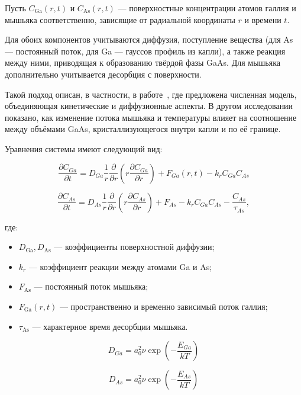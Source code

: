 \documentclass[14pt,oneside]{extarticle}
\begin{document}
Пусть $C_{\text{Ga}}(r,t)$ и $C_{\text{As}}(r,t)$ — поверхностные концентрации атомов галлия и мышьяка соответственно, зависящие от радиальной координаты $r$ и времени $t$.

Для обоих компонентов учитываются диффузия, поступление вещества (для As — постоянный поток, для Ga — гауссов профиль из капли), а также реакция между ними, приводящая к образованию твёрдой фазы GaAs. Для мышьяка дополнительно учитывается десорбция с поверхности.

Такой подход описан, в частности, в работе~\cite{reyes2013_1}, где предложена численная модель, объединяющая кинетические и диффузионные аспекты. В другом исследовании~\cite{bietti2020} показано, как изменение потока мышьяка и температуры влияет на соотношение между объёмами GaAs, кристаллизующегося внутри капли и по её границе.

Уравнения системы имеют следующий вид:

\begin{equation}
\frac{\partial C_{Ga}}{\partial t}=D_{Ga}\frac{1}{r}\frac{\partial}{\partial r}\left(r\frac{\partial C_{Ga}}{\partial r}\right)+F_{Ga}\left(r,t\right)-k_{r}C_{Ga}C_{As}
\label{eq:ga_diff}
\end{equation}

\begin{equation}
\frac{\partial C_{As}}{\partial t}=D_{As}\frac{1}{r}\frac{\partial}{\partial r}\left(r\frac{\partial C_{As}}{\partial r}\right)+F_{As}-k_{r}C_{Ga}C_{As}-\frac{C_{As}}{\tau_{As}},
\label{eq:as_diff}
\end{equation}

где:
\begin{itemize}
  \item $D_{\text{Ga}}, D_{\text{As}}$ — коэффициенты поверхностной диффузии;
  \item $k_{r}$ — коэффициент реакции между атомами Ga и As;
  \item $F_{\text{As}}$ — постоянный поток мышьяка;
  \item $F_{\text{Ga}}(r,t)$ — пространственно и временно зависимый поток галлия;
  \item $\tau_{\text{As}}$ — характерное время десорбции мышьяка.
\end{itemize}

\begin{equation}
D_{Ga}=a_{0}^{2}\nu\exp\left(-\frac{E_{Ga}}{kT}\right)
\end{equation}

\begin{equation}
D_{As}=a_{0}^{2}\nu\exp\left(-\frac{E_{As}}{kT}\right)
\end{equation}
\end{document}
